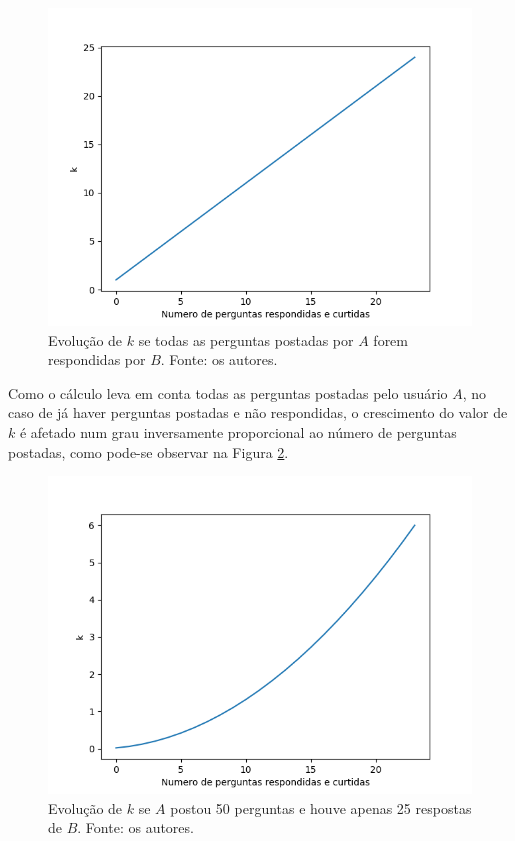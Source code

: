 \begin{figure}[!htb]
\centering
\includegraphics[width=14cm]{grafico_k1.png}
\caption{Evolução de $k$ se todas as perguntas postadas por $A$ forem respondidas por $B$. Fonte: os autores.}
\label{fig:grafico_k1}
\end{figure}

Como o cálculo leva em conta todas as perguntas postadas pelo usuário $A$, no caso de já haver perguntas postadas e não respondidas, o crescimento do valor de $k$ é afetado num grau inversamente proporcional ao número de perguntas postadas, como pode-se observar na Figura \ref{fig:grafico_k2}.

\begin{figure}[!htb]
\centering
\includegraphics[width=14cm]{grafico_k2.png}
\caption{Evolução de $k$ se $A$ postou 50 perguntas e houve apenas 25 respostas de $B$. Fonte: os autores.}
\label{fig:grafico_k2}
\end{figure}

